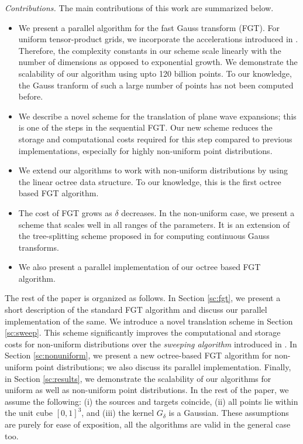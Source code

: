 {\em Contributions.} The main contributions of this work are summarized below.
\begin{itemize} 
%
\item We present a parallel algorithm for the fast Gauss transform (FGT). For uniform tensor-product grids, we incorporate
 the accelerations introduced in \cite{fggt}. Therefore, the complexity constants in our scheme scale linearly with 
 the number of dimensions as opposed to exponential growth. We demonstrate the scalability of our algorithm using 
 upto 120 billion points. To our knowledge, the Gauss tranform of such a large number of points has not been computed before.
%
\item We describe a novel scheme for the translation of plane wave expansions; this is one of the steps in the
 sequential FGT. Our new scheme reduces the storage and computational costs required for this step compared to
  previous implementations, especially for highly non-uniform point distributions.
%
\item We extend our algorithms to work with non-uniform distributions by using the linear octree data structure. To our knowledge,
this is the first octree based FGT algorithm. 

\item The cost of FGT grows as $\delta$ decreases. In the non-uniform case, we present a scheme that scales
 well in all ranges of the parameters. It is an extension of the tree-splitting scheme proposed 
 in \cite{veerapaneni08} for computing continuous Gauss transforms. 

\item We also present a parallel implementation of our octree based FGT algorithm.
%
\end{itemize}

The rest of the paper is organized as follows. In Section \ref{sc:fgt}, we present a short description of the
 standard FGT algorithm and discuss our parallel implementation of the same. We introduce a novel translation scheme 
 in Section \ref{sc:sweep}. This scheme significantly improves the computational and storage costs for 
 non-uniform distributions over the {\em sweeping algorithm} introduced in \cite{greengard98}. In Section \ref{sc:nonuniform}, we present a 
 new octree-based FGT algorithm for non-uniform point distributions; we also discuss
 its parallel implementation. Finally, in Section \ref{sc:results}, we demonstrate the scalability of our algorithms 
 for uniform as well as non-uniform point distributions. In the rest of the paper, we assume the following: (i) the 
 sources and targets coincide, (ii) all points lie within the unit cube $[0, 1]^3$, and (iii) the kernel $G_\delta$ is a Gaussian. These
 assumptions are purely for ease of exposition, all the algorithms are valid in the general case too. 
 
